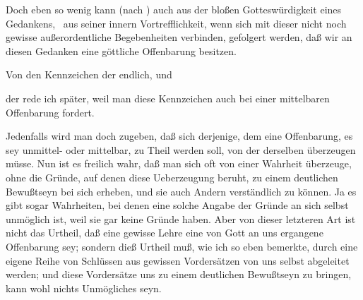 \begin{aufza}
\begin{aufzb}
\item Doch eben so wenig kann (nach ) auch aus der bloßen Gotteswürdigkeit eines Gedankens, \dh\ aus seiner innern Vortrefflichkeit, wenn sich mit dieser nicht noch gewisse außerordentliche Begebenheiten verbinden, gefolgert werden, daß wir an diesen Gedanken eine göttliche Offenbarung besitzen.
\item Von den Kennzeichen der  endlich, und
\item der  rede ich später, weil man diese Kennzeichen auch bei einer mittelbaren Offenbarung fordert.
\end{aufzb}
\item Jedenfalls wird man doch zugeben, daß sich derjenige, dem eine Offenbarung, es sey unmittel- oder mittelbar, zu Theil werden soll, von der  derselben überzeugen müsse. Nun ist es freilich wahr, daß man sich oft von einer Wahrheit überzeuge, ohne die Gründe, auf denen diese Ueberzeugung beruht, zu einem deutlichen Bewußtseyn bei sich erheben, und sie auch Andern verständlich  zu können. Ja es gibt sogar Wahrheiten, bei denen eine solche Angabe der Gründe an sich selbst unmöglich ist, weil sie gar keine Gründe haben. Aber von dieser letzteren Art ist nicht das Urtheil, daß eine gewisse Lehre eine von Gott an uns ergangene Offenbarung sey; sondern dieß Urtheil muß, wie ich so eben bemerkte, durch eine eigene Reihe von Schlüssen aus gewissen Vordersätzen von uns selbst abgeleitet werden; und diese Vordersätze uns zu einem deutlichen Bewußtseyn zu bringen, kann wohl nichts Unmögliches seyn.
\end{aufza}

